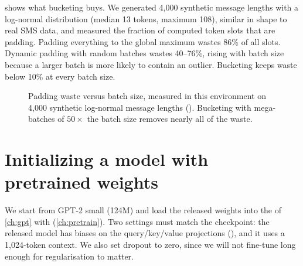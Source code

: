  shows what bucketing buys. We generated 4{,}000 synthetic
message lengths with a log-normal distribution (median 13 tokens, maximum 108), similar
in shape to real SMS data, and measured the fraction of computed token slots that are
padding. Padding everything to the global maximum wastes 86\% of all slots. Dynamic
padding with random batches wastes 40--76\%, rising with batch size because a larger
batch is more likely to contain an outlier. Bucketing keeps waste below 10\% at every
batch size.

\begin{figure}[ht]
\centering
{}
\caption{Padding waste versus batch size, measured in this environment on 4{,}000
synthetic log-normal message lengths (). Bucketing with
mega-batches of $50\times$ the batch size removes nearly all of the waste.}
\label{fig:classify:waste}
\end{figure}

\section{Initializing a model with pretrained weights}\label{sec:classify:init}

We start from GPT-2 small (124M) and load the released weights into the
 of \cref{ch:gpt} with 
(\cref{ch:pretrain}). Two settings must match the checkpoint: the released model has
biases on the query/key/value projections (), and it uses a
1{,}024-token context. We also set dropout to zero, since we will not fine-tune long
enough for regularisation to matter.

